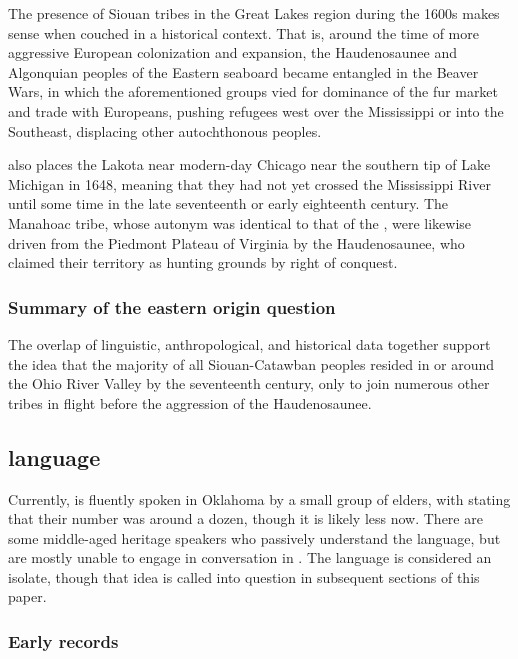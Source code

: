 \documentclass[output=paper]{LSP/langsci}
\begin{document}
The presence of Siouan tribes in the Great Lakes region during the 1600s makes sense when couched in a historical context. That is, around the time of more aggressive European colonization and expansion, the Haudenosaunee and Algonquian peoples of the Eastern seaboard became entangled in the Beaver Wars, in which the aforementioned groups vied for dominance of the fur market and trade with Europeans, pushing refugees west over the Mississippi or into the Southeast, displacing other autochthonous peoples. 

\citet{Jennings1990} also places the Lakota near modern-day Chicago near the southern tip of Lake Michigan in 1648, meaning that they had not yet crossed the Mississippi River until some time in the late seventeenth or early eighteenth century. The Manahoac tribe, whose autonym was identical to that of the , were likewise driven from the Piedmont Plateau of Virginia by the Haudenosaunee, who claimed their territory as hunting grounds by right of conquest.

\subsubsection{Summary of the eastern origin question} 

The overlap of linguistic, anthropological, and historical data together support the idea that the majority of all Siouan-Catawban peoples resided in or around the Ohio River Valley by the seventeenth century, only to join numerous other tribes in flight before the aggression of the Haudenosaunee.

\subsection{ language}

Currently,  is fluently spoken in Oklahoma by a small group of elders, with \citet{Linn2000} stating that their number was around a dozen, though it is likely less now. There are some middle-aged heritage speakers who passively understand the language, but are mostly unable to engage in conversation in . The language is considered an isolate, though that idea is called into question in subsequent sections of this paper.

\subsubsection{Early records} 
\end{document}
